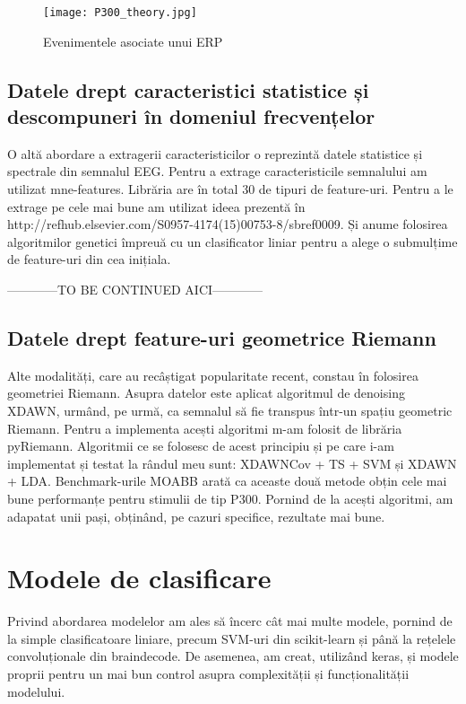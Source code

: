 \vspace{1em}
\begin{figure}[h]
    \centering
    \texttt{[image: P300\_theory.jpg]}
    \caption{Evenimentele asociate unui ERP\cite{P300_image}}
    \label{fig:enter-label}
\end{figure}


\subsection{Datele drept caracteristici statistice și descompuneri în domeniul frecvențelor}

O altă abordare a extragerii caracteristicilor o reprezintă datele statistice și spectrale din semnalul EEG. Pentru a extrage caracteristicile semnalului am utilizat mne-features\cite{mne-features}. Librăria are în total 30 de tipuri de feature-uri. Pentru a le extrage pe cele mai bune am utilizat ideea prezentă în http://refhub.elsevier.com/S0957-4174(15)00753-8/sbref0009. Și anume folosirea algoritmilor genetici împreuă cu un clasificator liniar pentru a alege o submulțime de feature-uri din cea inițiala.

------------TO BE CONTINUED AICI------------

\subsection{Datele drept feature-uri geometrice Riemann}
Alte modalități, care au recâștigat popularitate recent, constau în folosirea geometriei Riemann. Asupra datelor este aplicat algoritmul de denoising XDAWN\cite{xdawn}, urmând, pe urmă, ca semnalul să fie transpus într-un spațiu geometric Riemann. Pentru a implementa acești algoritmi m-am folosit de librăria pyRiemann\cite{pyriemann}. Algoritmii ce se folosesc de acest principiu și pe care i-am implementat și testat la rândul meu sunt: XDAWNCov + TS + SVM\cite{xdawncovtssvm} și XDAWN + LDA\cite{xdawnlda}. Benchmark-urile MOABB\cite{moabb}  arată ca aceaste două metode obțin cele mai bune performanțe pentru stimulii de tip P300. Pornind de la acești algoritmi, am adapatat unii pași, obținând, pe cazuri specifice, rezultate mai bune.

\section{Modele de clasificare}
Privind abordarea modelelor am ales să încerc cât mai multe modele, pornind de la simple clasificatoare liniare, precum SVM-uri din scikit-learn\cite{scikit-learn} și până la rețelele convoluționale din braindecode\cite{braindecode}. De asemenea, am creat, utilizând keras\cite{keras}, și modele proprii pentru un mai bun control asupra complexității și funcționalității modelului.
